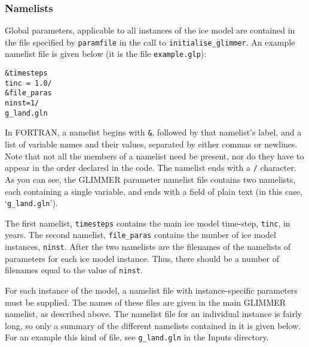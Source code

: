 \subsubsection{Namelists}
%
Global parameters, applicable to all instances of the ice model are contained
in the file specified by \texttt{paramfile} in the call to
\texttt{initialise\_glimmer}. An example namelist file is given below (it is
the file \texttt{example.glp}):
%
\begin{verbatim}
&timesteps
tinc = 1.0/
&file_paras
ninst=1/
g_land.gln
\end{verbatim}
%
In FORTRAN, a namelist begins with \texttt{\&}, followed by that namelist's
label, and a list of variable names and their values, separated by either
commas or newlines. Note that not all the members of a namelist need be
present, nor do they have to appear in the order declared in the code. 
The namelist ends with a \texttt{/} character. As you can see, the GLIMMER
parameter namelist file contains two namelists, each containing a single
variable, and ends with a field of plain text (in this case, `\texttt{g\_land.gln}').

The first namelist, \texttt{timesteps} contains the main ice model time-step,
\texttt{tinc}, in years. The second namelist, \texttt{file\_paras} contains
the number of ice model instances, \texttt{ninst}. After the two namelists are
the filenames of the namelists of parameters for each ice model
instance. Thus, there should be a number of filenames equal to the value of \texttt{ninst}.

For each instance of the model, a namelist file with instance-specific
parameters must be supplied. The names of these files are given in the main
GLIMMER namelist, as described above. The namelist file for an individual
instance is fairly long, so only a summary of the different namelists
contained in it is given below. For an example this kind of file, see
\texttt{g\_land.gln} in the Inputs directory.

